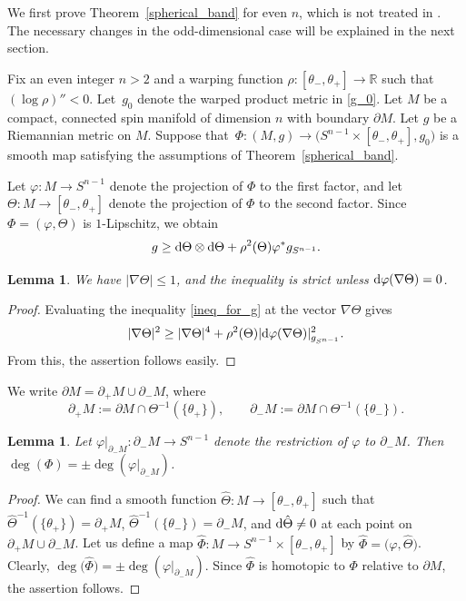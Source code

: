 \documentclass[11pt]{article}
\numberwithin{equation}{section}
\numberwithin{equation}{section}
\newtheorem{Lemma}[Theorem]{Lemma}
\newcommand{\R}{\mathbb{R}}
\begin{document}
We first prove Theorem~\ref{spherical_band} for even $n$, which is not treated in \cite{Cecchini-Zeidler}.
The necessary changes in the odd-dimensional case will be explained in the next section.

Fix an even integer $n>2$ and a warping function $\rho\colon [\theta_- , \theta_+] \to \R$ such that $(\log \rho)''<0$.
Let~$g_0$ denote the warped product metric in \eqref{g_0}.
Let $M$ be a compact, connected spin manifold of dimension $n$ with boundary $\partial M$.
Let $g$ be a Riemannian metric on $M$.
Suppose that~${\Phi\colon (M,g) \to \big(S^{n-1} \times [\theta_-,\theta_+],g_0\big)}$ is a smooth map satisfying the assumptions of Theorem~\ref{spherical_band}.

Let $\varphi\colon M \to S^{n-1}$ denote the projection of $\Phi$ to the first factor, and let $\Theta\colon M \to [\theta_-,\theta_+]$ denote the projection of $\Phi$ to the second factor. Since $\Phi = (\varphi,\Theta)$ is $1$-Lipschitz, we obtain
\begin{equation} \label{ineq_for_g}
 g \geq {\rm d}\Theta \otimes {\rm d}\Theta + \rho^2(\Theta) \varphi^* g_{S^{n-1}}.
\end{equation}

\begin{Lemma}
\label{gradient_of_Theta}
We have $|\nabla \Theta| \leq 1$, and the inequality is strict unless ${\rm d}\varphi(\nabla \Theta) = 0$.
\end{Lemma}

\begin{proof}
Evaluating the inequality \eqref{ineq_for_g} at the vector $\nabla \Theta$ gives
\[|\nabla \Theta|^2 \geq |\nabla \Theta|^4 + \rho^2(\Theta) |{\rm d}\varphi(\nabla \Theta)|_{g_{S^{n-1}}}^2.\]
From this, the assertion follows easily.
\end{proof}

We write $\partial M = \partial_+ M \cup \partial_- M$, where
\[
\partial_+ M := \partial M \cap \Theta^{-1}(\{\theta_+\}), \qquad \partial_- M := \partial M \cap \Theta^{-1}(\{\theta_-\}).
\]

\begin{Lemma} \label{deg_of_restriction}
Let $\varphi|_{\partial_- M}\colon \partial_- M \to S^{n-1}$ denote the restriction of $\varphi$ to $\partial_- M$.
Then $\deg(\Phi) = \pm \deg(\varphi|_{\partial_- M})$.
\end{Lemma}

\begin{proof}
We can find a smooth function $\hat{\Theta}\colon M \to [\theta_-,\theta_+]$ such that $\hat{\Theta}^{-1}(\{\theta_+\}) = \partial_+ M$, $\hat{\Theta}^{-1}(\{\theta_-\}) = \partial_- M$, and ${\rm d}\hat{\Theta} \neq 0$ at each point on $\partial_+ M \cup \partial_- M$.
Let us define a map $\hat{\Phi}\colon M \to S^{n-1} \times [\theta_-,\theta_+]$ by $\hat{\Phi} = \big(\varphi,\hat{\Theta}\big)$. Clearly, $\deg\big(\hat{\Phi}\big) = \pm \deg(\varphi|_{\partial_- M})$.
Since $\hat{\Phi}$ is homotopic to $\Phi$ relative to $\partial M$, the assertion follows.
\end{proof}
\end{document}
